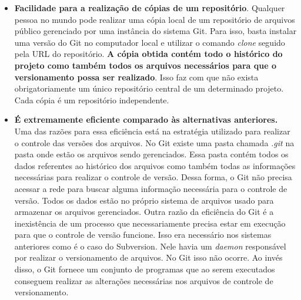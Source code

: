\begin{itemize}
\item \textbf{Facilidade para a realização de cópias de um repositório}. Qualquer pessoa no mundo pode realizar uma cópia local de um repositório de arquivos público gerenciado por uma instância do sistema Git. Para isso, basta instalar uma versão do Git no computador local e utilizar o comando \textit{clone} seguido pela URL do repositório. \textbf{A cópia obtida contém todo o histórico do projeto como também todos os arquivos necessários para que o versionamento possa ser realizado}. Isso faz com que não exista obrigatoriamente um único repositório central de um determinado projeto. Cada cópia é um repositório independente. 

\item \textbf{É extremamente eficiente comparado às alternativas anteriores.} Uma das razões para essa eficiência está na estratégia utilizado para realizar o controle das versões dos arquivos. No Git existe uma pasta chamada \textit{.git} na pasta onde estão os arquivos sendo gerenciados. Essa pasta contém todos os dados referentes ao histórico dos arquivos como também todas as informações necessárias para realizar o controle de versão. Dessa forma, o Git não precisa acessar a rede para buscar alguma informação necessária para o controle de versão. Todos os dados estão no próprio sistema de arquivos usado para armazenar os arquivos gerenciados. Outra razão da eficiência do Git é a inexistência de um processo que necessariamente precisa estar em execução para que o controle de versão funcione. Isso era necessário nos sistemas anteriores como é o caso do Subversion. Nele havia um \textit{daemon} responsável por realizar o versionamento de arquivos. No Git isso não ocorre. Ao invés disso, o Git fornece um conjunto de programas que ao serem executados conseguem realizar as alterações necessárias nos arquivos de controle de versionamento. 

\end{itemize}


